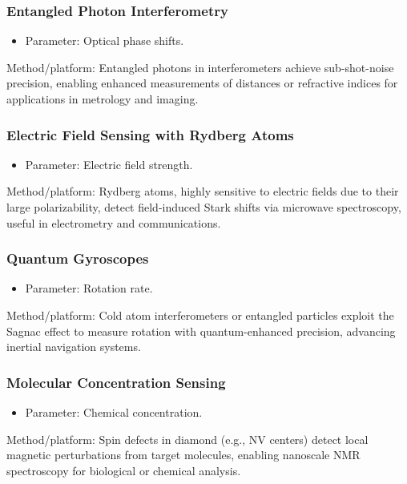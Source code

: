 \documentclass{beamer}
\begin{document}
\begin{frame}
\frametitle{Entangled Photon Interferometry}

\begin{itemize}
\item Parameter: Optical phase shifts.
\end{itemize}

\noindent
\begin{block}{}
Method/platform: Entangled photons in interferometers achieve sub-shot-noise precision, enabling enhanced measurements of distances or refractive indices for applications in metrology and imaging.
\end{block}
\end{frame}

\begin{frame}
\frametitle{Electric Field Sensing with Rydberg Atoms}

\begin{itemize}
\item Parameter: Electric field strength.  
\end{itemize}

\noindent
\begin{block}{}
Method/platform: Rydberg atoms, highly sensitive to electric fields due to their large polarizability, detect field-induced Stark shifts via microwave spectroscopy, useful in electrometry and communications.
\end{block}
\end{frame}

\begin{frame}
\frametitle{Quantum Gyroscopes}

\begin{itemize}
\item Parameter: Rotation rate.  
\end{itemize}

\noindent
\begin{block}{}
Method/platform: Cold atom interferometers or entangled particles exploit the Sagnac effect to measure rotation with quantum-enhanced precision, advancing inertial navigation systems.
\end{block}
\end{frame}

\begin{frame}
\frametitle{Molecular Concentration Sensing}

\begin{itemize}
\item Parameter: Chemical concentration.  
\end{itemize}

\noindent
\begin{block}{}
Method/platform: Spin defects in diamond (e.g., NV centers) detect local magnetic perturbations from target molecules, enabling nanoscale NMR spectroscopy for biological or chemical analysis.
\end{block}
\end{frame}
\end{document}
